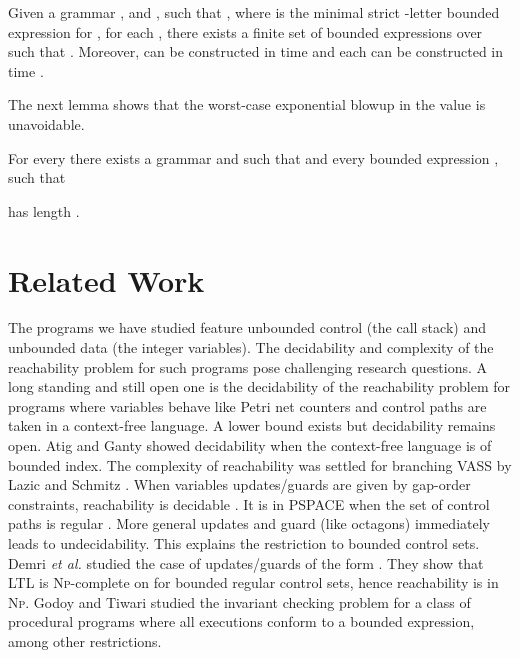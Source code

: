 \documentclass[final]{llncs}
\begin{document}
\begin{theorem}\label{thm:letter-bounded-control-set}
Given a grammar ,
and , such that ,
where  is the minimal strict -letter bounded expression
for , for each , there exists a finite set 
of bounded expressions  over  such that 
.
Moreover,  can be constructed in
time  and each
 can be constructed in
time .
\end{theorem}
The next lemma shows that the worst-case exponential blowup in the value 
is unavoidable. 

\begin{lemma}\label{lem:optimality}
For every  there exists a
grammar  and
 such that  and
every bounded expression , such that
 
has length .
\end{lemma}


\section{Related Work} 
The programs we have studied feature unbounded control (the
call stack) and unbounded data (the integer variables). The
decidability and complexity of the reachability problem for such
programs pose challenging research questions. A long standing and still
open one is the decidability of the reachability problem for programs
where variables behave like Petri net counters and control paths are
taken in a context-free language.  A lower bound
exists \cite{Lazic__2012} but decidability remains
open. Atig and Ganty \cite{AG11} showed decidability when the
context-free language is of bounded index.  The complexity of
reachability was settled for branching VASS by Lazic and
Schmitz \cite{Lazi__2014}. When variables
updates/guards are given by gap-order constraints, reachability
is decidable \cite{Abdulla_2013,Revesz93}. It is in
PSPACE when the set of control paths is regular \cite{Bozzelli_2014}.  
More general updates and guard (like
octagons) immediately leads to undecidability. This explains the
restriction to bounded control sets. Demri \textit{et
al.} \cite{Demri_2012} studied the case of updates/guards of the
form . They show that LTL is \textsc{Np}-complete  on 
for bounded regular control sets, hence reachability is in \textsc{Np}.
Godoy and Tiwari \cite{GT09} studied the invariant checking problem for a class of procedural programs where all executions
conform to a bounded expression, among other restrictions.
\end{document}
